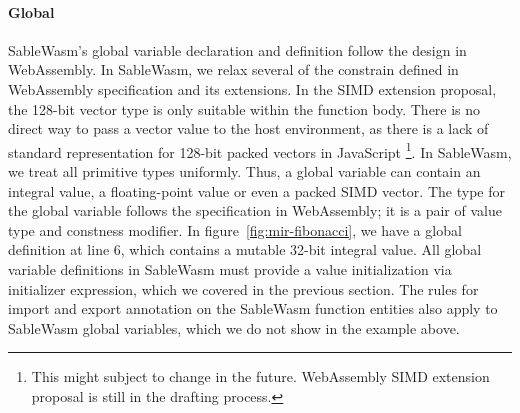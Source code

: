 \paragraph{Global}
SableWasm's global variable declaration and definition follow the design in WebAssembly. In SableWasm, we relax several of the constrain defined in WebAssembly specification and its extensions. In the SIMD extension proposal, the 128-bit vector type is only suitable within the function body. There is no direct way to pass a vector value to the host environment, as there is a lack of standard representation for 128-bit packed vectors in JavaScript \footnote{This might subject to change in the future. WebAssembly SIMD extension proposal is still in the drafting process.}. In  SableWasm, we treat all primitive types uniformly. Thus, a global variable can contain an integral value, a floating-point value or even a packed SIMD vector. The type for the global variable follows the specification in WebAssembly; it is a pair of value type and constness modifier. In figure~\ref{fig:mir-fibonacci}, we have a global definition at line 6, which contains a mutable 32-bit integral value. All global variable definitions in SableWasm must provide a value initialization via initializer expression, which we covered in the previous section. The rules for import and export annotation on the SableWasm function entities also apply to SableWasm global variables, which we do not show in the example above. 

